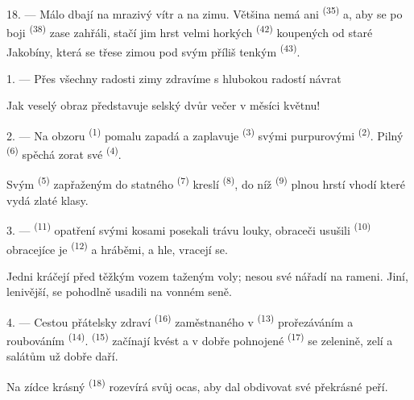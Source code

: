 18. --- Málo dbají na mrazivý vítr a na zimu. Většina nemá ani 
\textsuperscript{(35)} a, aby se po boji 
\textsuperscript{(38)} zase zahřáli, stačí jim hrst velmi horkých 
\textsuperscript{(42)} koupených od staré  Jakobíny, která se třese
zimou pod svým příliš tenkým  \textsuperscript{(43)}.

\VUsaut{3.0mm}
\VUsaut{3.0mm}

\VUsaut{4.0mm}

1. --- Přes všechny radosti zimy zdravíme s hlubokou radostí návrat 

Jak veselý obraz představuje selský dvůr večer v měsíci květnu!

2. --- Na obzoru  \textsuperscript{(1)} pomalu zapadá a zaplavuje
 \textsuperscript{(3)} svými purpurovými 
\textsuperscript{(2)}. Pilný  \textsuperscript{(6)} spěchá zorat své
 \textsuperscript{(4)}.

Svým  \textsuperscript{(5)} zapřaženým do statného 
\textsuperscript{(7)} kreslí  \textsuperscript{(8)}, do níž
 \textsuperscript{(9)} plnou hrstí vhodí  které vydá
zlaté klasy.

3. ---  \textsuperscript{(11)} opatření svými kosami posekali trávu
louky, obraceči usušili  \textsuperscript{(10)} obracejíce je
 \textsuperscript{(12)} a hráběmi, a hle, vracejí se.

Jedni kráčejí před těžkým vozem taženým voly; nesou své nářadí na rameni. Jiní,
lenivější, se pohodlně usadili na vonném seně.

4. --- Cestou přátelsky zdraví  \textsuperscript{(16)}
zaměstnaného v  \textsuperscript{(13)} prořezáváním
 a roubováním  \textsuperscript{(14)}.
 \textsuperscript{(15)} začínají kvést a v dobře pohnojené
 \textsuperscript{(17)} se zelenině, zelí a salátům už
dobře daří.

Na zídce krásný  \textsuperscript{(18)} rozevírá svůj ocas, aby dal
obdivovat své překrásné peří.

